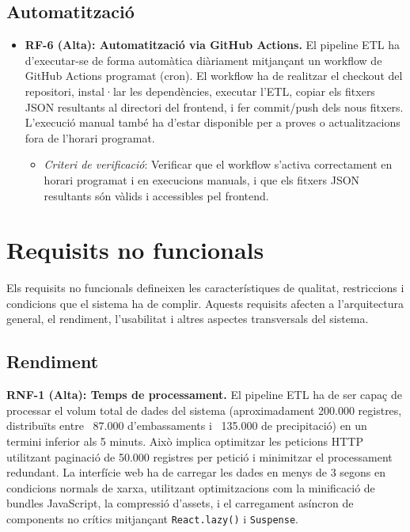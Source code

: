 \subsection{Automatització}

\begin{itemize}
    \item \textbf{RF-6 (Alta): Automatització via GitHub Actions.} El pipeline ETL ha d'executar-se de forma automàtica diàriament mitjançant un workflow de GitHub Actions programat (cron). El workflow ha de realitzar el checkout del repositori, instal·lar les dependències, executar l'ETL, copiar els fitxers JSON resultants al directori del frontend, i fer commit/push dels nous fitxers. L'execució manual també ha d'estar disponible per a proves o actualitzacions fora de l'horari programat.
    \begin{itemize}
        \item \textit{Criteri de verificació}: Verificar que el workflow s'activa correctament en horari programat i en execucions manuals, i que els fitxers JSON resultants són vàlids i accessibles pel frontend.
    \end{itemize}
\end{itemize}


\section{Requisits no funcionals}

Els requisits no funcionals defineixen les característiques de qualitat, restriccions i condicions que el sistema ha de complir. Aquests requisits afecten a l'arquitectura general, el rendiment, l'usabilitat i altres aspectes transversals del sistema.

\subsection{Rendiment}

\textbf{RNF-1 (Alta): Temps de processament.} El pipeline ETL ha de ser capaç de processar el volum total de dades del sistema (aproximadament 200.000 registres, distribuïts entre ~87.000 d'embassaments i ~135.000 de precipitació) en un termini inferior als 5 minuts. Això implica optimitzar les peticions HTTP utilitzant paginació de 50.000 registres per petició i minimitzar el processament redundant. La interfície web ha de carregar les dades en menys de 3 segons en condicions normals de xarxa, utilitzant optimitzacions com la minificació de bundles JavaScript, la compressió d'assets, i el carregament asíncron de components no crítics mitjançant \texttt{React.lazy()} i \texttt{Suspense}.

